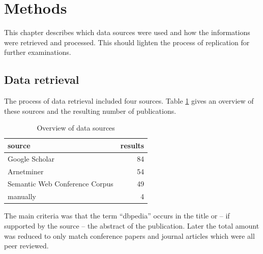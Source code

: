 \documentclass[english]{lni}
\begin{document}
\section{Methods}
\label{sec-2}

  This chapter describes which data sources were used and how the informations
  were retrieved and processed. This should lighten the process of replication
  for further examinations.
\subsection{Data retrieval}
\label{sec-2-1}

   The process of data retrieval included four sources. Table
   \ref{tab:datenquellen} gives an overview of these sources and the resulting
   number of publications.
\begin{table}[htb]
\caption{Overview of data sources} \label{tab:datenquellen}
\begin{center}
\begin{tabular}{lr}
\hline
 source                          &  results  \\
\hline
 Google Scholar                  &       84  \\
 Arnetminer                      &       54  \\
 Semantic Web Conference Corpus  &       49  \\
 manually                        &        4  \\
\hline
\end{tabular}
\end{center}
\end{table}

   The main criteria was that the term ``dbpedia'' occurs in the title
   or -- if supported by the source -- the abstract of the
   publication. Later the total amount was reduced to only match
   conference papers and journal articles which were all peer
   reviewed.
\end{document}

